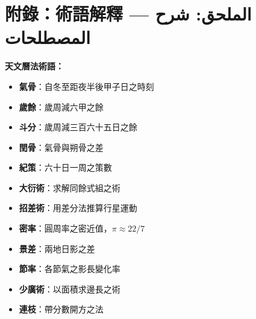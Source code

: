\documentclass[11pt,a4paper]{article}
\newcommand{\ar}[1]{\arabicfont\beginR #1\endR}
\begin{document}
\vspace{1cm}

\section*{附錄：術語解釋 — \ar{الملحق: شرح المصطلحات}}

\noindent
\begin{minipage}[t]{0.48\textwidth}
\textbf{天文曆法術語：}
\begin{itemize}[leftmargin=1.5em]
  \item \textbf{氣骨}：自冬至距夜半後甲子日之時刻
  \item \textbf{歲餘}：歲周減六甲之餘
  \item \textbf{斗分}：歲周減三百六十五日之餘
  \item \textbf{閏骨}：氣骨與朔骨之差
  \item \textbf{紀策}：六十日一周之策數
  \item \textbf{大衍術}：求解同餘式組之術
  \item \textbf{招差術}：用差分法推算行星運動
  \item \textbf{密率}：圓周率之密近值，$\pi \approx 22/7$
  \item \textbf{景差}：兩地日影之差
  \item \textbf{節率}：各節氣之影長變化率
  \item \textbf{少廣術}：以面積求邊長之術
  \item \textbf{連枝}：帶分數開方之法
\end{itemize}
\end{minipage}
\hfill
\end{document}
